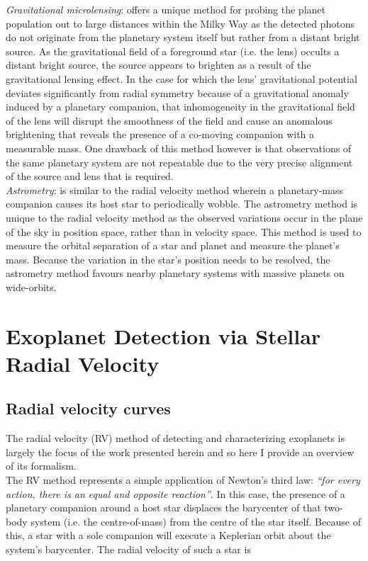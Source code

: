 \emph{Gravitational microlensing}:
offers a unique method for probing the planet population out to large distances
within the Milky Way as the detected photons do not originate from the planetary system itself
but rather from a distant bright source. As the gravitational field of a
foreground star (i.e. the lens) occults a distant bright source, the source appears to
brighten as a result of the gravitational lensing effect. In the case for which the lens' gravitational
potential deviates significantly from radial symmetry because of a gravitational anomaly induced by a
planetary companion, that inhomogeneity in the gravitational field of the lens will disrupt the smoothness
of the field and cause an anomalous brightening that reveals the presence of a co-moving companion with
a measurable mass. One drawback of this method however is that observations of the same planetary
system are not repeatable due to the very precise alignment of the source and lens that is required. \\

\emph{Astrometry}: is similar to the radial velocity method wherein a planetary-mass companion
causes its host star to periodically wobble. The astrometry method is unique to the radial velocity
method as the observed variations occur in the plane of the sky in position space, rather than in velocity
space. This method is used to measure the orbital separation of a
star and planet and measure the planet's mass. Because the variation in the star's position
needs to be resolved, the astrometry method favours nearby planetary systems with massive
planets on wide-orbits. \\


\section{Exoplanet Detection via Stellar Radial Velocity} \label{sect:rv}
\subsection{Radial velocity curves}
The radial velocity (RV) method of detecting and characterizing exoplanets is largely
the focus of the work presented herein and so here I provide an overview of its formalism. \\

The RV method represents a simple 
application of Newton's third law: \emph{``for every action, there is an equal 
and opposite reaction''}. In this case, the presence of a planetary companion around a 
host star displaces the barycenter of that two-body system (i.e. the centre-of-mass) from the
centre of the star itself. Because of this, a star with a sole companion 
will execute a Keplerian orbit about the system's barycenter. The radial velocity of such a star
is

